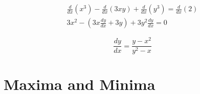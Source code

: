 \begin{align*}
    \frac{d}{dx}(x^3) -  \frac{d}{dx}(3xy) +  \frac{d}{dx}(y^3) =  \frac{d}{dx}(2)\\
    3x^2 - \left(3x\frac{dy}{dx} + 3y\right) + 3y^2\frac{dy}{dx} = 0
\end{align*}

\begin{equation*}
    \frac{dy}{dx} = \frac{y - x^2}{y^2 - x}
\end{equation*}

\section{Maxima and Minima}

